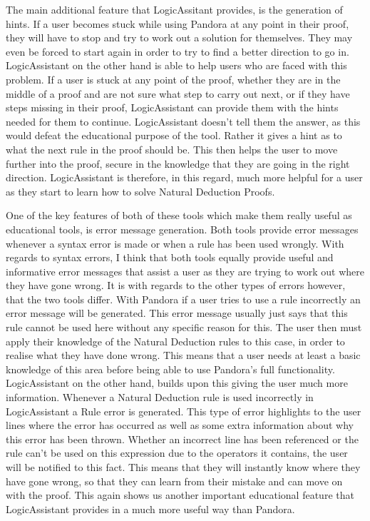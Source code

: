 The main additional feature that LogicAssitant provides, is the generation of hints. If a user becomes stuck while using Pandora at any point in their proof, they will have to stop and try to work out a solution for themselves. They may even be forced to start again in order to try to find a better direction to go in. LogicAssistant on the other hand is able to help users who are faced with this problem. If a user is stuck at any point of the proof, whether they are in the middle of a proof and are not sure what step to carry out next, or if they have steps missing in their proof, LogicAssistant can provide them with the hints needed for them to continue. LogicAssistant doesn't tell them the answer, as this would defeat the educational purpose of the tool. Rather it gives a hint as to what the next rule in the proof should be. This then helps the user to move further into the proof, secure in the knowledge that they are going in the right direction. LogicAssistant is therefore, in this regard, much more helpful for a user as they start to learn how to solve Natural Deduction Proofs.

One of the key features of both of these tools which make them really useful as educational tools, is error message generation. Both tools provide error messages whenever a syntax error is made or when a rule has been used wrongly. With regards to syntax errors, I think that both tools equally provide useful and informative error messages that assist a user as they are trying to work out where they have gone wrong. It is with regards to the other types of errors however, that the two tools differ. With Pandora if a user tries to use a rule incorrectly an error message will be generated. This error message usually just says that this rule cannot be used here without any specific reason for this. The user then must apply their knowledge of the Natural Deduction rules to this case, in order to realise what they have done wrong. This means that a user needs at least a basic knowledge of this area before being able to use Pandora's full functionality. LogicAssistant on the other hand, builds upon this giving the user much more information. Whenever a Natural Deduction rule is used incorrectly in LogicAssistant a Rule error is generated. This type of error highlights to the user lines where the error has occurred as well as some extra information about why this error has been thrown. Whether an incorrect line has been referenced or the rule can't be used on this expression due to the operators it contains, the user will be notified to this fact. This means that they will instantly know where they have gone wrong, so that they can learn from their mistake and can move on with the proof. This again shows us another important educational feature that LogicAssistant provides in a much more useful way than Pandora.

